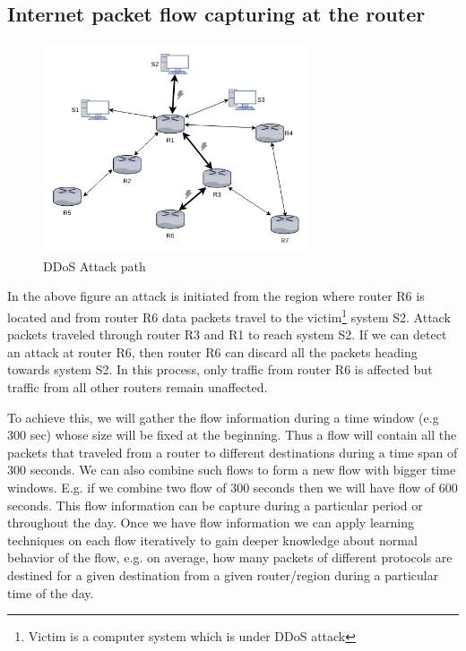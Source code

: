 \documentclass[12pt,oneside,a4paper]{article}
\begin{document}
\subsection{Internet packet flow capturing at the router}

\begin{figure}[H]
\centering
\includegraphics[width=0.70\textwidth]{attack_path.png}
\caption{DDoS Attack path} \label{fig:attackpath}
\end{figure}


In the above figure an attack is initiated from the region where router R6 is located and from router R6 data packets travel to the victim\footnote{Victim is a computer system which is under DDoS attack} system S2. Attack packets traveled through router R3 and R1 to reach system S2. If we can detect an attack at router R6, then router R6 can discard all the packets heading towards system S2. In this process, only traffic from router R6 is affected but traffic from all other routers remain unaffected.

To achieve this, we will gather the flow information during a time window (e.g 300 sec) whose size will be fixed at the beginning. Thus a flow will contain all the packets that traveled from a router to different destinations during a time span of 300 seconds. We can also combine such flows to form a new flow with bigger time windows. E.g. if we combine two flow of 300 seconds then we will have flow of 600 seconds. This flow information can be capture during a particular period or throughout the day. Once we have flow information we can apply learning techniques on each flow iteratively to gain deeper knowledge about normal behavior of the flow, e.g. on average, how many packets of different protocols are destined for a given destination from a given router/region during a particular time of the day.
\end{document}
